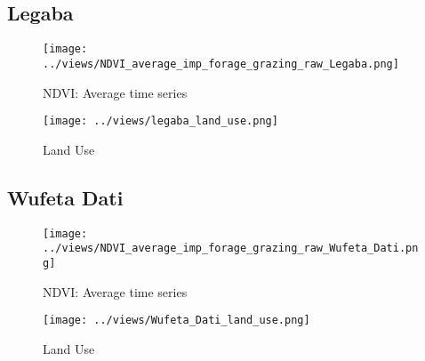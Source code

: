 \documentclass[10pt,a4paper,onecolumn]{article}
\begin{document}

\pagebreak


\subsection{Legaba}
\begin{figure}[H] \centering
  \captionsetup{justification=centering}
\caption{NDVI: Average time series } 
\centering


\texttt{[image: ../views/NDVI\_average\_imp\_forage\_grazing\_raw\_Legaba.png]}

\end{figure}

\begin{figure}[H] \centering
  \captionsetup{justification=centering}
\caption{Land Use} 
\centering


\texttt{[image: ../views/legaba\_land\_use.png]}

\end{figure}



\pagebreak


\subsection{Wufeta Dati}
\begin{figure}[H] \centering
  \captionsetup{justification=centering}
\caption{NDVI: Average time series } 
\centering


\texttt{[image: ../views/NDVI\_average\_imp\_forage\_grazing\_raw\_Wufeta\_Dati.png]}

\end{figure}


\begin{figure}[H] \centering
  \captionsetup{justification=centering}
\caption{Land Use} 
\centering


\texttt{[image: ../views/Wufeta\_Dati\_land\_use.png]}

\end{figure}
\end{document}

